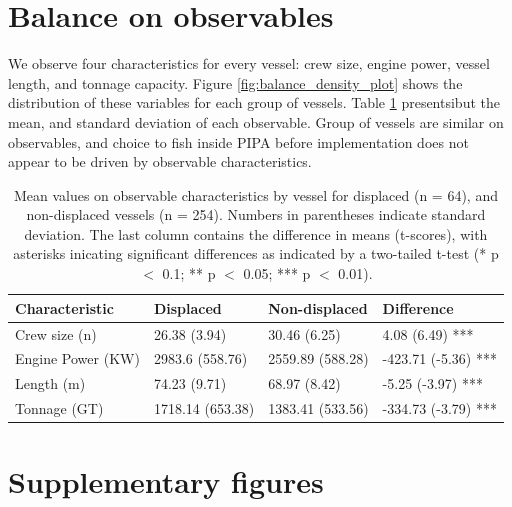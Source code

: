 \documentclass[12pt]{article}
\begin{document}
\section{Balance on observables}

We observe four characteristics for every vessel: crew size, engine power, vessel length, and tonnage capacity. Figure \ref{fig:balance_density_plot} shows the distribution of these variables for each group of vessels. Table \ref{tab:balance_table} presentsibut the mean, and standard deviation of each observable. Group of vessels are similar on observables, and choice to fish inside PIPA before implementation does not appear to be driven by observable characteristics.

\begin{table}[H]

\caption{\label{tab:balance_table}Mean values on observable characteristics by vessel for displaced (n = 64), and non-displaced vessels (n = 254). Numbers in parentheses indicate standard deviation. The last column contains the difference in means (t-scores), with asterisks inicating significant differences as indicated by a two-tailed t-test (* p $<$ 0.1; ** p $<$ 0.05; *** p $<$ 0.01).}
\centering
\begin{tabular}{l|l|l|l}
\hline
Characteristic & Displaced & Non-displaced & Difference\\
\hline
Crew size (n) & 26.38 (3.94) & 30.46 (6.25) & 4.08 (6.49) ***\\
\hline
Engine Power (KW) & 2983.6 (558.76) & 2559.89 (588.28) & -423.71 (-5.36) ***\\
\hline
Length (m) & 74.23 (9.71) & 68.97 (8.42) & -5.25 (-3.97) ***\\
\hline
Tonnage (GT) & 1718.14 (653.38) & 1383.41 (533.56) & -334.73 (-3.79) ***\\
\hline
\end{tabular}
\end{table}

\clearpage

\FloatBarrier

\section{Supplementary figures}
\end{document}
